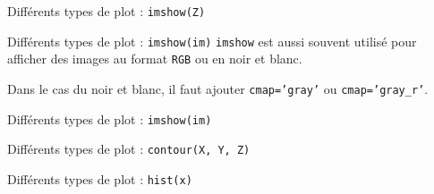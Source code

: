 \begin{frame}{Différents types de plot : \texttt{imshow(Z)}}
    \begin{minipage}[t]{0.49\linewidth}

    \end{minipage}
    \begin{minipage}[t]{0.49\linewidth}
        \vfill
    \end{minipage}
\end{frame}

\begin{frame}{Différents types de plot : \texttt{imshow(im)}}
    \alert{\texttt{imshow}} est aussi souvent utilisé pour afficher des images au format \texttt{RGB} ou en noir et blanc. 
    
    Dans le cas du noir et blanc, il faut ajouter \texttt{cmap='gray'} ou \texttt{cmap='gray\_r'}.
\end{frame}

\begin{frame}{Différents types de plot : \texttt{imshow(im)}}
    \begin{minipage}[t]{0.49\linewidth}

    \end{minipage}
    \begin{minipage}[t]{0.49\linewidth}
        \vfill
    \end{minipage}
\end{frame}

\begin{frame}{Différents types de plot : \texttt{contour(X, Y, Z)}}
    \begin{minipage}[t]{0.49\linewidth}
    \end{minipage}
    \begin{minipage}[t]{0.49\linewidth}
        \vfill
    \end{minipage}
\end{frame}

\begin{frame}{Différents types de plot : \texttt{hist(x)}}
    \begin{minipage}[t]{0.49\linewidth}
    \end{minipage}
    \begin{minipage}[t]{0.49\linewidth}
        \vfill
    \end{minipage}
\end{frame}

